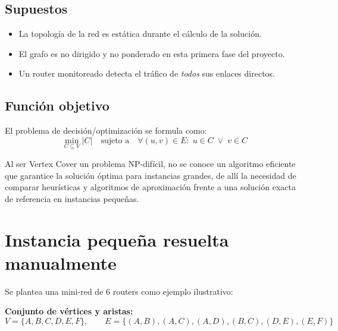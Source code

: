 \documentclass[11pt,a4paper]{article}
\begin{document}
\subsection{Supuestos}
\begin{itemize}
	\item La topología de la red es estática durante el cálculo de la solución.
	\item El grafo es no dirigido y no ponderado en esta primera fase del proyecto.
	\item Un router monitoreado detecta el tráfico de \emph{todos} sus enlaces directos.
\end{itemize}

\subsection{Función objetivo}
El problema de decisión/optimización se formula como:
\begin{equation}
	\min_{C \subseteq V} |C|
	\quad \text{sujeto a} \quad
	\forall (u,v) \in E: \; u \in C \; \lor \; v \in C
\end{equation}

Al ser Vertex Cover un problema NP-difícil, no se conoce un algoritmo eficiente que
garantice la solución óptima para instancias grandes, de allí la necesidad de comparar
heurísticas y algoritmos de aproximación frente a una solución exacta de referencia en
instancias pequeñas.

\section{Instancia pequeña resuelta manualmente}

Se plantea una mini-red de 6 routers como ejemplo ilustrativo:

\begin{center}
\end{center}

\textbf{Conjunto de vértices y aristas:}
\[
V = \{A, B, C, D, E, F\}, \qquad
E = \{(A,B),(A,C),(A,D),(B,C),(D,E),(E,F)\}
\]
\end{document}
